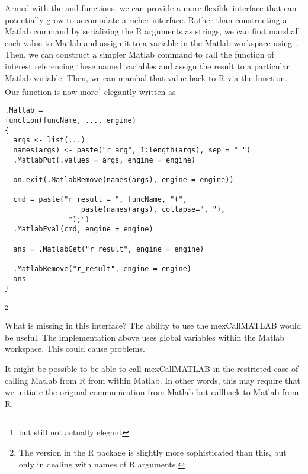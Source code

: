 \documentclass{article}
\begin{document}
Armed with the  and 
functions, we can provide a more flexible interface that can
potentially grow to accomodate a richer interface.  Rather than
constructing a Matlab command by serializing the R arguments as
strings, we can first marshall each value to Matlab and assign it to a
variable in the Matlab workspace using .  Then,
we can construct a simpler Matlab command to call the function of
interest referencing these named variables and assign the result to a
particular Matlab variable.  Then, we can marshal that value back to R
via the  function.  Our 
function is now more\footnote{but still not actually elegant}
elegantly written as 
\begin{verbatim}
.Matlab = 
function(funcName, ..., engine)
{
  args <- list(...)
  names(args) <- paste("r_arg", 1:length(args), sep = "_")
  .MatlabPut(.values = args, engine = engine)

  on.exit(.MatlabRemove(names(args), engine = engine))

  cmd = paste("r_result = ", funcName, "(", 
                  paste(names(args), collapse=", "),
               ");")
  .MatlabEval(cmd, engine = engine)

  ans = .MatlabGet("r_result", engine = engine)

  .MatlabRemove("r_result", engine = engine)
  ans
}
\end{verbatim}
\footnote{The version in the R package is slightly more
sophisticated than this, but only in dealing with
names of R arguments.}

What is missing in this interface?
The ability to use the mexCallMATLAB
would be useful.
The implementation above uses global variables
within the Matlab workspace. This could cause problems.

It might be possible to be able
to call mexCallMATLAB in the restricted
case of calling Matlab from R from within
Matlab. In other words, this may require
that we initiate  the original communication from
Matlab but callback to Matlab from R.
\end{document}

